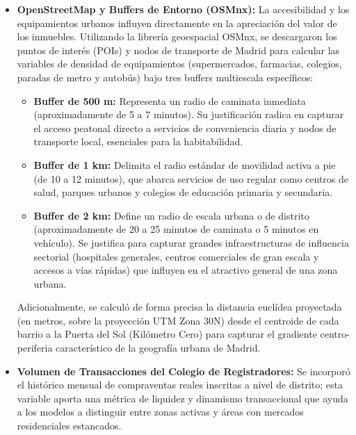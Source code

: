 \documentclass[a4paper,11pt,openany]{book}
\begin{document}
\begin{itemize}
    \item \textbf{OpenStreetMap y Buffers de Entorno (OSMnx):} La accesibilidad y los equipamientos urbanos influyen directamente en la apreciación del valor de los inmuebles. Utilizando la librería geoespacial OSMnx, se descargaron los puntos de interés (POIs) y nodos de transporte de Madrid para calcular las variables de densidad de equipamientos (supermercados, farmacias, colegios, paradas de metro y autobús) bajo tres buffers multiescala específicos:
    \begin{itemize}
        \item \textbf{Buffer de 500 m:} Representa un radio de caminata inmediata (aproximadamente de 5 a 7 minutos). Su justificación radica en capturar el acceso peatonal directo a servicios de conveniencia diaria y nodos de transporte local, esenciales para la habitabilidad.
        \item \textbf{Buffer de 1 km:} Delimita el radio estándar de movilidad activa a pie (de 10 a 12 minutos), que abarca servicios de uso regular como centros de salud, parques urbanos y colegios de educación primaria y secundaria.
        \item \textbf{Buffer de 2 km:} Define un radio de escala urbana o de distrito (aproximadamente de 20 a 25 minutos de caminata o 5 minutos en vehículo). Se justifica para capturar grandes infraestructuras de influencia sectorial (hospitales generales, centros comerciales de gran escala y accesos a vías rápidas) que influyen en el atractivo general de una zona urbana.
    \end{itemize}
    \newpage
    Adicionalmente, se calculó de forma precisa la distancia euclídea proyectada (en metros, sobre la proyección UTM Zona 30N) desde el centroide de cada barrio a la Puerta del Sol (Kilómetro Cero) para capturar el gradiente centro-periferia característico de la geografía urbana de Madrid.
    \item \textbf{Volumen de Transacciones del Colegio de Registradores:} Se incorporó el histórico mensual de compraventas reales inscritas a nivel de distrito; esta variable aporta una métrica de liquidez y dinamismo transaccional que ayuda a los modelos a distinguir entre zonas activas y áreas con mercados residenciales estancados.
    
    \begin{table}[H]
    \hspace*{0.6cm}
    \renewcommand{\arraystretch}{1.5}
    \caption{Fuentes de datos oficiales para el volumen de transacciones.}
    \label{tab:fuente_transacciones}
    \end{table}


\end{itemize}
\end{document}
